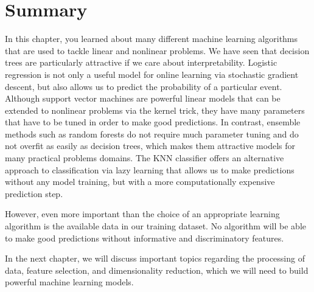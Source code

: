 \documentclass[11pt]{article}
\begin{document}
    \section{Summary}\label{summary}

    In this chapter, you learned about many different machine learning
algorithms that are used to tackle linear and nonlinear problems. We
have seen that decision trees are particularly attractive if we care
about interpretability. Logistic regression is not only a useful model
for online learning via stochastic gradient descent, but also allows us
to predict the probability of a particular event. Although support
vector machines are powerful linear models that can be extended to
nonlinear problems via the kernel trick, they have many parameters that
have to be tuned in order to make good predictions. In contrast,
ensemble methods such as random forests do not require much parameter
tuning and do not overfit as easily as decision trees, which makes them
attractive models for many practical problems domains. The KNN
classifier offers an alternative approach to classification via lazy
learning that allows us to make predictions without any model training,
but with a more computationally expensive prediction step.

However, even more important than the choice of an appropriate learning
algorithm is the available data in our training dataset. No algorithm
will be able to make good predictions without informative and
discriminatory features.

In the next chapter, we will discuss important topics regarding the
processing of data, feature selection, and dimensionality reduction,
which we will need to build powerful machine learning models.


    
    
    
    
\end{document}
